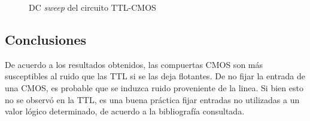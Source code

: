 \documentclass[../../e3_tp2_main.tex]{subfiles}
\begin{document}
\begin{figure}[H]
	\centering
	\caption{DC \textit{sweep} del circuito TTL-CMOS}
\end{figure}



\subsection{Conclusiones}

De acuerdo a los resultados obtenidos, las compuertas CMOS son m\'as susceptibles al ruido que las TTL si se las deja flotantes. De no fijar la entrada de una CMOS, es probable que se induzca ruido proveniente de la linea. Si bien esto no se observ\'o en la TTL, es una buena pr\'actica fijar entradas no utilizadas a un valor l\'ogico determinado, de acuerdo a la bibliograf\'ia consultada.
\end{document}
